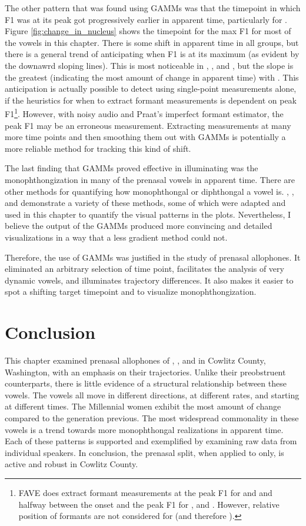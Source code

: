 The other pattern that was found using GAMMs was that the timepoint in which F1 was at its peak got progressively earlier in apparent time, particularly for \ben. Figure \ref{fig:change_in_nucleus} shows the timepoint for the max F1 for most of the vowels in this chapter. There is some shift in apparent time in all groups, but there is a general trend of anticipating when F1 is at its maximum (as evident by the downawrd sloping lines). This is most noticeable in  \bet, \ben, and \bin, but the slope is the greatest (indicating the most amount of change in apparent time) with \ben. This anticipation is actually possible to detect using single-point measurements alone, if the heuristics for when to extract formant measurements is dependent on peak F1\footnote{FAVE does extract formant measurements at the peak F1 for \face and \price and halfway between the onset and the peak F1 for \goat, and \mouth\citep[35]{labov_etal_2013}. However, relative position of formants are not considered for \dress (and therefore \ben).}. However, with noisy audio and Praat's imperfect formant estimator, the peak F1 may be an erroneous measurement. Extracting measurements at many more time points and then smoothing them out with GAMMs is potentially a more reliable method for tracking this kind of shift.

The last finding that GAMMs proved effective in illuminating was the monophthongization in many of the prenasal vowels in apparent time. There are other methods for quantifying how monophthongal or diphthongal a vowel is. \citet{morrison_2013}, \citet{jacewicz_etal_2006}, and \citet{farrington_etal_2018} demonstrate a variety of these methods, some of which were adapted and used in this chapter to quantify the visual patterns in the plots. Nevertheless, I believe the output of the GAMMs produced more convincing and detailed visualizations in a way that a less gradient method could not.

Therefore, the use of GAMMs was justified in the study of prenasal allophones. It eliminated an arbitrary selection of time point, facilitates the analysis of very dynamic vowels, and illuminates trajectory differences. It also makes it easier to spot a shifting target timepoint and to visualize monophthongization.

\section{Conclusion}
\label{sec:prenasal_conclusion}

This chapter examined prenasal allophones of \trap, \dress, and \kit in Cowlitz County, Washington, with an emphasis on their trajectories. Unlike their preobstruent counterparts, there is little evidence of a structural relationship between these vowels. The vowels all move in different directions, at different rates, and starting at different times. The Millennial women exhibit the most amount of change compared to the generation previous. The most widespread commonality in these vowels is a trend towards more monophthongal realizations in apparent time. Each of these patterns is supported and exemplified by examining raw data from individual speakers. In conclusion, the prenasal split, when applied to \trap only, is active and robust in Cowlitz County.
